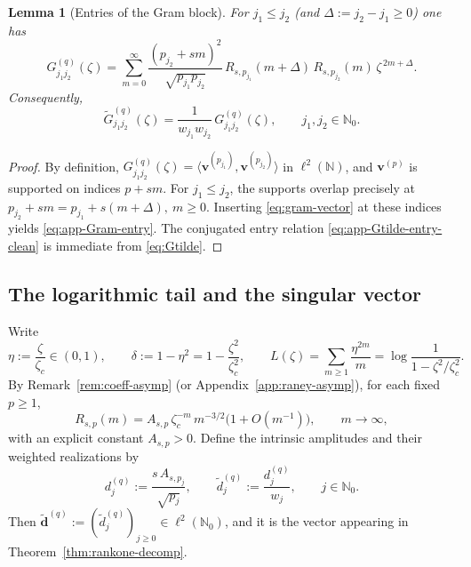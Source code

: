 \documentclass[11pt]{amsart}
\numberwithin{equation}{section}
\theoremstyle{plain}
\newtheorem{lemma}[theorem]{Lemma}
\theoremstyle{definition}
\theoremstyle{remark}
\newcommand{\NN}{\mathbb{N}}
\begin{document}
\begin{lemma}[Entries of the Gram block]\label{lem:Gram-entry}
	For $j_1\le j_2$ (and $\Delta:=j_2-j_1\ge0$) one has
	\begin{equation}\label{eq:app-Gram-entry}
		G^{(q)}_{j_1j_2}(\zeta)
		=
		\sum_{m=0}^{\infty}
		\frac{(p_{j_2}+sm)^{2}}{\sqrt{p_{j_1}p_{j_2}}}\,
		R_{s,p_{j_1}}(m+\Delta)\,R_{s,p_{j_2}}(m)\,\zeta^{\,2m+\Delta}.
	\end{equation}
	Consequently,
	\begin{equation}\label{eq:app-Gtilde-entry-clean}
		\widetilde G^{(q)}_{j_1j_2}(\zeta)
		=
		\frac{1}{w_{j_1}w_{j_2}}\,G^{(q)}_{j_1j_2}(\zeta),
		\qquad j_1,j_2\in\NN_0.
	\end{equation}
\end{lemma}

\begin{proof}
	By definition,
	$G^{(q)}_{j_1j_2}(\zeta)=\langle \bm v^{(p_{j_1})},\bm v^{(p_{j_2})}\rangle$
	in $\ell^2(\NN)$, and $\bm v^{(p)}$ is supported on indices $p+sm$.
	For $j_1\le j_2$, the supports overlap precisely at
	\(
	p_{j_2}+sm=p_{j_1}+s(m+\Delta),\ m\ge0.
	\)
	Inserting \eqref{eq:gram-vector} at these indices yields \eqref{eq:app-Gram-entry}.
	The conjugated entry relation \eqref{eq:app-Gtilde-entry-clean} is immediate from
	\eqref{eq:Gtilde}.
\end{proof}

\subsection{The logarithmic tail and the singular vector}

Write
\[
	\eta:=\frac{\zeta}{\zeta_c}\in(0,1),
	\qquad
	\delta:=1-\eta^2=1-\frac{\zeta^2}{\zeta_c^2},
	\qquad
	L(\zeta)=\sum_{m\ge1}\frac{\eta^{2m}}{m}=\log\frac{1}{1-\zeta^2/\zeta_c^2}.
\]
By Remark~\ref{rem:coeff-asymp} (or Appendix~\ref{app:raney-asymp}), for each
fixed $p\ge1$,
\begin{equation}\label{eq:app-Raney-asymp-used}
	R_{s,p}(m)
	=
	A_{s,p}\,\zeta_c^{-m}\,m^{-3/2}\bigl(1+O(m^{-1})\bigr),
	\qquad m\to\infty,
\end{equation}
with an explicit constant $A_{s,p}>0$.  Define the intrinsic amplitudes and their weighted realizations by
\begin{equation}\label{eq:app-d-def}
	d^{(q)}_j:=\frac{s\,A_{s,p_j}}{\sqrt{p_j}},\qquad \widetilde d^{(q)}_j:=\frac{d^{(q)}_j}{w_j},
	\qquad j\in\NN_0.
\end{equation}
Then $\widetilde{\bm d}^{(q)}:=(\widetilde d^{(q)}_j)_{j\ge0}\in\ell^2(\NN_0)$,
and it is the vector appearing in Theorem~\ref{thm:rankone-decomp}.
\end{document}
